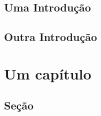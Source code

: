 \documentclass{article}
\begin{document}
\capa


\section{Uma Introdução}
\subcapa

\section{Outra Introdução}
\subcapa

\chapter[2]{Um capítulo}
\subcapa

\section{Seção}
\subcapa
\end{document}
